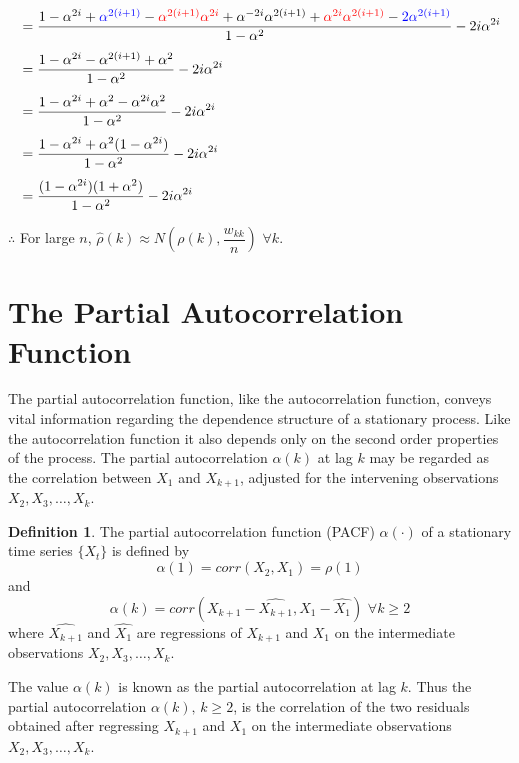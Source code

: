 \documentclass[11pt, a4paper]{article}
\numberwithin{equation}{section}
\theoremstyle{definition}
\newtheorem{definition}{Definition}[section]
\begin{document}
\begin{align*}
&= \dfrac{1 - \alpha^{2i} + \textcolor{blue}{\alpha^{2(i+1)}} - \textcolor{red}{\alpha^{2(i+1)}\alpha^{2i}} + \alpha^{-2i}\alpha^{2(i+1)} + \textcolor{red}{\alpha^{2i}\alpha^{2(i+1)}} - \textcolor{blue}{2\alpha^{2(i+1)}}}{1 - \alpha^{2}} - 2i \alpha^{2i}  \\[0.35em]
&= \dfrac{1 - \alpha^{2i} - \alpha^{2(i+1)} + \alpha^{2}}{1 - \alpha^{2}} - 2i \alpha^{2i} \\[0.35em]
&= \dfrac{1 - \alpha^{2i} + \alpha^{2} - \alpha^{2i}\alpha^{2}}{1 - \alpha^{2}} - 2i \alpha^{2i} \\[0.35em]
&= \dfrac{1 - \alpha^{2i} + \alpha^{2} (1 - \alpha^{2i})}{1 - \alpha^{2}} - 2i \alpha^{2i} \\[0.35em]
&= \dfrac{(1 - \alpha^{2i}) (1  + \alpha^{2})}{1 - \alpha^{2}} - 2i \alpha^{2i}
\end{align*}

$\therefore$ For large $n$, $\hat{\rho}(k) \approx N\left( \rho(k), \dfrac{w_{kk}}{n} \right)$ $\forall k$.

\newpage

\section{The Partial Autocorrelation Function}

The partial autocorrelation function, like the autocorrelation function, conveys vital information regarding the dependence structure of a stationary process. Like the autocorrelation function it also depends only on the second order properties of the process. The partial autocorrelation $\alpha(k)$ at lag $k$ may be regarded as the correlation between $X_1$ and $X_{k+1}$, adjusted for the intervening 
observations $X_2, X_3, \ldots, X_k$.

\begin{definition}\label{PACFdefinition1}
The partial autocorrelation function (PACF) $\alpha(\cdot)$ of a stationary time series $\{X_t\}$ is defined by
$$\alpha(1) = corr(X_2, X_1) = \rho(1)$$
and
$$\alpha(k) = corr(X_{k+1} - \widehat{X_{k+1}}, X_1 - \widehat{X_1}) \,\, \forall k \geq 2$$
where $\widehat{X_{k+1}}$ and $\widehat{X_1}$ are regressions of $X_{k+1}$ and $X_1$ on the intermediate observations $X_2, X_3, \ldots, X_k$.
\end{definition}

The value $\alpha(k)$ is known as the partial autocorrelation at lag $k$. Thus the partial autocorrelation $\alpha(k), \, k \geq 2$, is the correlation of the two residuals obtained after regressing $X_{k+1}$ and $X_1$ on the intermediate observations $X_2, X_3, \ldots, X_k$.
\end{document}
